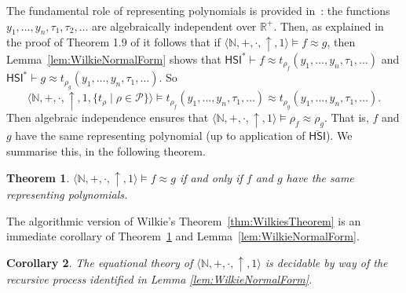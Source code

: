 \documentclass[eqnor,reqno]{amsart}
\theoremstyle{plain}
\newtheorem{thm}{Theorem}[section]
\newtheorem{cor}[thm]{Corollary}
\theoremstyle{definition}
\newcommand{\HSI}{\textsf{HSI}}
\begin{document}
The fundamental role of representing polynomials is provided in~\cite[Theorem 4.4]{wil00}: the functions $y_1,\dots,y_n,\tau_1,\tau_2,\dots$ are algebraically independent over $\mathbb{R}^+$.  
Then, as explained in the proof of Theorem 1.9 of \cite{wil00} it follows that if $\langle \mathbb{N},+,\cdot,\uparrow,1\rangle\models f\approx g$, then Lemma~\ref{lem:WilkieNormalForm} shows that $\HSI^*\vdash f\approx t_{\rho_f}(y_1,\dots,y_n,\tau_1,\dots)$ and $\HSI^*\vdash g\approx t_{\rho_g}(y_1,\dots,y_n,\tau_1,\dots)$.  
So 
\[
\langle \mathbb{N},+,\cdot,\uparrow,1,\{t_{\rho}\mid \rho\in \mathcal{P}\}\rangle\models t_{\rho_f}(y_1,\dots,y_n,\tau_1,\dots)\approx t_{\rho_g}(y_1,\dots,y_n,\tau_1,\dots).
\]  
Then algebraic independence ensures that $\langle \mathbb{N},+,\cdot,\uparrow,1\rangle\models \rho_f\approx \rho_g$.  
That is, $f$ and $g$ have the same representing polynomial (up to application of $\overline{\HSI}$).
We summarise this, in the following theorem.
\begin{thm}\label{thm:samerep}
$\langle \mathbb{N},+,\cdot,\uparrow,1\rangle\models f\approx g$ if and only if $f$ and $g$ have the same representing polynomials.  
\end{thm} 
The algorithmic version of Wilkie's Theorem~\ref{thm:WilkiesTheorem} is an immediate corollary of Theorem~\ref{thm:samerep} and Lemma~\ref{lem:WilkieNormalForm}.
\begin{cor}
The equational theory of $\langle \mathbb{N},+,\cdot,\uparrow,1\rangle$ is decidable by way of the recursive process identified in Lemma \ref{lem:WilkieNormalForm}.
\end{cor}
\end{document}
